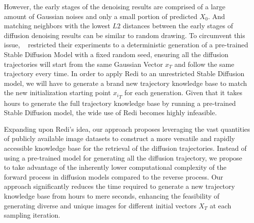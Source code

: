 However, the early stages of the denoising results are comprised of a large amount of Gaussian noises and only a small portion of predicted $X_0$. And matching neighbors with the lowest $L2$ distances between the early stages of diffusion denoising results can be similar to random drawing. To circumvent this issue, ~\citet{zhang2023redi} restricted their experiments to a deterministic generation of a pre-trained Stable Diffusion Model with a fixed random seed, ensuring all the diffusion trajectories will start from the same Gaussian Vector $x_T$ and follow the same trajectory every time. In order to apply Redi to an unrestricted Stable Diffusion model, we will have to generate a brand new trajectory knowledge base to match the new initialization starting point ${{x_i}_T}$ for each generation. Given that it takes hours to generate the full trajectory knowledge base by running a pre-trained Stable Diffusion model, the wide use of Redi becomes highly infeasible. 

Expanding upon Redi's idea, our approach proposes leveraging the vast quantities of publicly available image datasets to construct a more versatile and rapidly accessible knowledge base for the retrieval of the diffusion trajectories. Instead of using a pre-trained model for generating all the diffusion trajectory, we propose to take advantage of the inherently lower computational complexity of the forward process in diffusion models compared to the reverse process. Our approach significantly reduces the time required to generate a new trajectory knowledge base from hours to mere seconds, enhancing the feasibility of generating diverse and unique images for different initial vectors $X_T$ at each sampling iteration.


